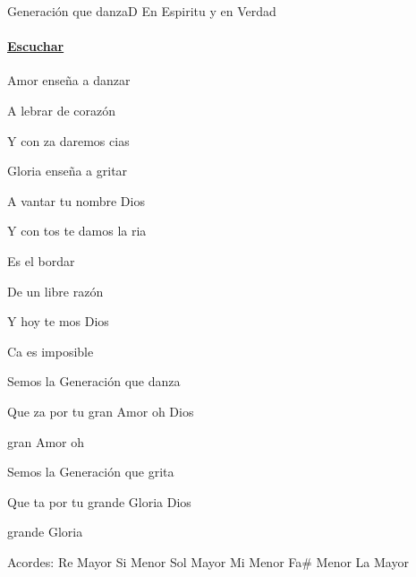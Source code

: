\documentclass[12pt, spanish]{book}
\begin{document}
    \begin{song}{Generación que danza}{D}
    {} %
    {En Espiritu y en Verdad}
    {} %
    {}
        \ifChordBk
        \paragraph{\mbox{}\hfill\protect\href{https://open.spotify.com/intl-es/track/4VVZMguosiqCkCLg3k5hjB}{Escuchar}\mbox{}\hfill}
        \fi

        \begin{SBOpGroup}
             Amor enseña a danzar

            A lebrar de corazón

            Y con za daremos cias
        \end{SBOpGroup}
        \vskip 20pt
        \begin{SBOpGroup}
             Gloria enseña a gritar

            A vantar tu nombre Dios

            Y con tos te damos la ria
        \end{SBOpGroup}
        \vskip 20pt
        \begin{SBOpGroup}
            Es el bordar

            De un libre razón

            Y hoy te mos Dios

            Ca es imposible
        \end{SBOpGroup}

        \begin{SBChorus}
            Semos la Generación que danza

            Que za por tu gran Amor oh Dios

             gran Amor oh 

            Semos la Generación que grita

            Que ta por tu grande Gloria Dios

             grande Gloria 
        \end{SBChorus}

        \ifChordBk
        \begin{SBOpGroup}
            Acordes:\break
            \upchord{\D}\qquad Re Mayor \hfill
            \upchord{\Bm}\qquad Si Menor \hfill\null\break
            \upchord{\G}\qquad Sol Mayor \hfill
            \upchord{\Em}\qquad Mi Menor \hfill\null\break
            \upchord{\Fsm}\qquad Fa\# Menor \hfill
            \upchord{\A}\qquad La Mayor \hfill\null\break
        \end{SBOpGroup}
        \fi
    \end{song}
\end{document}
